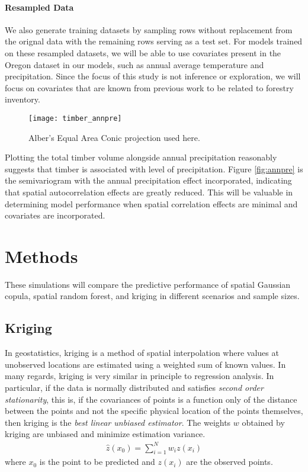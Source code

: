 \documentclass{article}
\begin{document}
\paragraph{Resampled Data} We also generate training datasets by sampling rows without replacement from the orignal data with the remaining rows serving as a test set.
For models trained on these resampled datasets, we will be able to use covariates present in the Oregon dataset in our models, such as annual average temperature and precipitation.
Since the focus of this study is not inference or exploration, we will focus on covariates that are known from previous work\cite{madsen09} to be related to forestry inventory.

\begin{center}
	\begin{figure}[ht]
		\texttt{[image: timber\_annpre]}
		\caption{Alber's Equal Area Conic projection used here.}
	\end{figure}
\end{center}
\vspace{-1cm}

Plotting the total timber volume alongside annual precipitation reasonably suggests that timber is associated with level of precipitation.
Figure \ref{fig:annpre} is the semivariogram with the annual precipitation effect incorporated, indicating that spatial autocorrelation effects are greatly reduced.
This will be valuable in determining model performance when spatial correlation effects are minimal and covariates are incorporated.

\section{Methods}
These simulations will compare the predictive performance of spatial Gaussian copula, spatial random forest, and kriging in different scenarios and sample sizes.

\subsection{Kriging}
In geostatistics, kriging is a method of spatial interpolation where values at unobserved locations are estimated using a weighted sum of known values.
In many regards, kriging is very similar in principle to regression analysis.
In particular, if the data is normally distributed and satisfies \textit{second order stationarity}, this is, if the covariances of points is a function only of the distance between the points and not the specific physical location of the points themselves, then kriging is the \textit{best linear unbiased estimator}\cite{cressie93}.
The weights $w$ obtained by kriging are unbiased and minimize estimation variance.
\begin{align*}
	\hat{z}(x_0) = \sum_{i=1}^{N} w_i z(x_i)
\end{align*}
where $x_0$ is the point to be predicted and $z(x_i)$ are the observed points.
\end{document}
